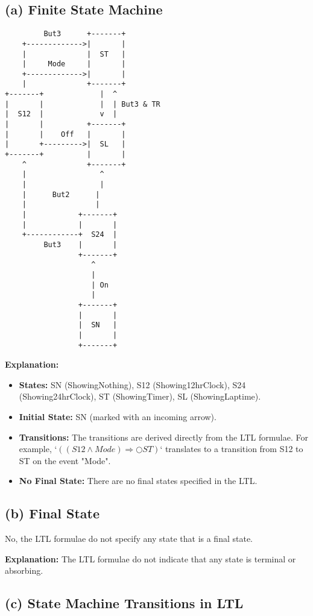 \documentclass{article}
\begin{document}
\subsection*{(a) Finite State Machine}

\begin{verbatim}
         But3      +-------+
    +------------->|       |
    |              |  ST   |
    |     Mode     |       |
    +------------->|       |
    |              +-------+
+-------+             |  ^
|       |             |  | But3 & TR
|  S12  |             v  |
|       |          +-------+
|       |    Off   |       |
|       +--------->|  SL   |
+-------+          |       |
    ^              +-------+
    |                 ^
    |                 |
    |      But2      |
    |                |
    |            +-------+
    |            |       |
    +------------+  S24  |
         But3    |       |
                 +-------+
                    ^
                    |
                    | On
                    |
                 +-------+
                 |       |
                 |  SN   |
                 |       |
                 +-------+
\end{verbatim}

\textbf{Explanation:}

\begin{itemize}
    \item \textbf{States:} SN (ShowingNothing), S12 (Showing12hrClock), S24 (Showing24hrClock), ST (ShowingTimer), SL (ShowingLaptime).
    \item \textbf{Initial State:} SN (marked with an incoming arrow).
    \item \textbf{Transitions:} The transitions are derived directly from the LTL formulae. For example, `$((S12 \land Mode) \Rightarrow \bigcirc ST)$` translates to a transition from S12 to ST on the event "Mode".
    \item \textbf{No Final State:} There are no final states specified in the LTL.
\end{itemize}
\subsection*{(b) Final State}

No, the LTL formulae do not specify any state that is a final state.

\textbf{Explanation:} The LTL formulae do not indicate that any state is terminal or absorbing.

\subsection*{(c) State Machine Transitions in LTL}
\end{document}
